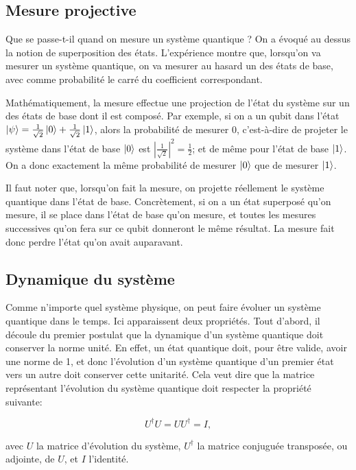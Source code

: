 \subsection{Mesure projective}
Que se passe-t-il quand on mesure un système quantique ? On a évoqué au dessus la notion de superposition des états. L'expérience montre que, lorsqu'on va mesurer un système quantique, on va mesurer au hasard un des états de base, avec comme probabilité le carré du coefficient correspondant.

Mathématiquement, la mesure effectue une projection de l'état du système sur un des états de base dont il est composé. Par exemple, si on a un qubit dans l'état $\ket{\psi} = \frac{1}{\sqrt{2}}\ket{0} + \frac{1}{\sqrt{2}}\ket{1}$, alors la probabilité de mesurer 0, c'est-à-dire de projeter le système dans l'état de base $\ket{0}$ est $|\frac{1}{\sqrt{2}}|^2 = \frac{1}{2}$; et de même pour l'état de base $\ket{1}$. On a donc exactement la même probabilité de mesurer $\ket{0}$ que de mesurer $\ket{1}$.

Il faut noter que, lorsqu'on fait la mesure, on projette réellement le système quantique dans l'état de base. Concrètement, si on a un état superposé qu'on mesure, il se place dans l'état de base qu'on mesure, et toutes les mesures successives qu'on fera sur ce qubit donneront le même résultat. La mesure fait donc perdre l'état qu'on avait auparavant.

\subsection{Dynamique du système}
Comme n'importe quel système physique, on peut faire évoluer un système quantique dans le temps. Ici apparaissent deux propriétés. Tout d'abord, il découle du premier postulat que la dynamique d'un système quantique doit conserver la norme unité. En effet, un état quantique doit, pour être valide, avoir une norme de 1, et donc l'évolution d'un système quantique d'un premier état vers un autre doit conserver cette unitarité. Cela veut dire que la matrice représentant l'évolution du système quantique doit respecter la propriété suivante:

\begin{equation}
    U^{\dagger}U = UU^{\dagger} = I,
\end{equation}

avec $U$ la matrice d'évolution du système, $U^{\dagger}$ la matrice conjuguée transposée, ou adjointe, de $U$, et $I$ l'identité.

